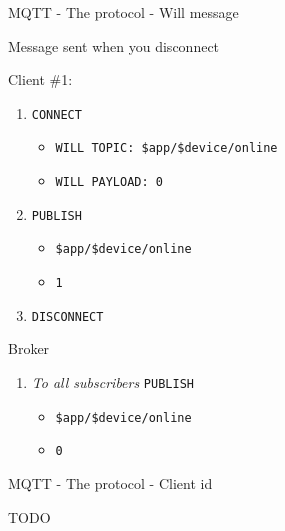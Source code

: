 \begin{frame}[fragile]{MQTT - The protocol - Will message}
\protect\hypertarget{mqtt---the-protocol---will-message}{}

Message sent when you disconnect

Client \#1:

\begin{enumerate}
[1.]
\tightlist
\item
  \texttt{CONNECT}

  \begin{itemize}
  \tightlist
  \item
    \texttt{WILL\ TOPIC:\ \$app/\$device/online}
  \item
    \texttt{WILL\ PAYLOAD:\ 0}
  \end{itemize}
\item
  \texttt{PUBLISH}

  \begin{itemize}
  \tightlist
  \item
    \texttt{\$app/\$device/online}
  \item
    \texttt{1}
  \end{itemize}
\item
  \texttt{DISCONNECT}
\end{enumerate}

Broker

\begin{enumerate}
[1.]
\tightlist
\item
  \emph{To all subscribers} \texttt{PUBLISH}

  \begin{itemize}
  \tightlist
  \item
    \texttt{\$app/\$device/online}
  \item
    \texttt{0}
  \end{itemize}
\end{enumerate}

\end{frame}

\begin{frame}{MQTT - The protocol - Client id}
\protect\hypertarget{mqtt---the-protocol---client-id}{}

TODO

\end{frame}

